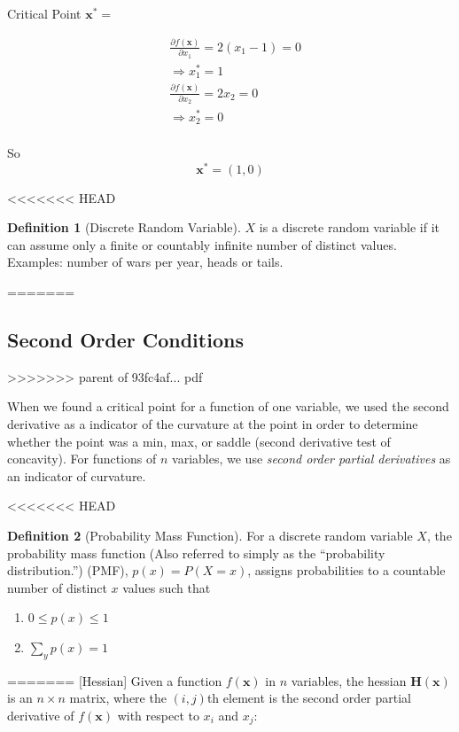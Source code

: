 \documentclass[]{book}
\providecommand{\tightlist}{%
  \setlength{\itemsep}{0pt}\setlength{\parskip}{0pt}}
\theoremstyle{definition}
\newtheorem{definition}{Definition}[chapter]
\theoremstyle{definition}
\theoremstyle{definition}
\theoremstyle{remark}
\begin{document}
Critical Point \(\mathbf{x}^* =\)

\begin{align*}
&\frac{\partial f(\mathbf{x})}{\partial x_1} = 2(x_1-1) = 0\\
&\Rightarrow x_1^* = 1\\
&\frac{\partial f(\mathbf{x})}{\partial x_2} = 2x_2 = 0\\
&\Rightarrow   x_2^* = 0\\
\end{align*}

So \[\mathbf{x}^* = (1,0)\]

<<<<<<< HEAD
\begin{definition}[Discrete Random Variable]
\protect\hypertarget{def:unnamed-chunk-75}{}{\label{def:unnamed-chunk-75} {} }\(X\) is a discrete random variable if it can assume only a finite or countably infinite number of distinct values. Examples: number of wars per year, heads or tails.
\end{definition}
=======
\hypertarget{second-order-conditions}{%
\subsection*{Second Order Conditions}\label{second-order-conditions}}
>>>>>>> parent of 93fc4af... pdf

When we found a critical point for a function of one variable, we used the second derivative as a indicator of the curvature at the point in order to determine whether the point was a min, max, or saddle (second derivative test of concavity). For functions of \(n\) variables, we use \emph{second order partial derivatives} as an indicator of curvature.

<<<<<<< HEAD
\begin{definition}[Probability Mass Function]
\protect\hypertarget{def:unnamed-chunk-76}{}{\label{def:unnamed-chunk-76} {} }
For a discrete random variable \(X\), the probability mass function (Also referred to simply as the ``probability distribution.'') (PMF), \(p(x)=P(X=x)\), assigns probabilities to a countable number of distinct \(x\) values such that

\begin{enumerate}
\def\labelenumi{\arabic{enumi}.}
\tightlist
\item
  \(0\le p(x)\le 1\)
\item
  \(\sum\limits_y p(x)=1\)
\end{enumerate}
\end{definition}
=======
[Hessian]
\protect\hypertarget{def:unnamed-chunk-56}{}{\label{def:unnamed-chunk-56} {} }
Given a function \(f(\mathbf{x})\) in \(n\) variables, the hessian \(\mathbf{H(x)}\) is
an \(n\times n\) matrix, where the \((i,j)\)th element is the second order
partial derivative of \(f(\mathbf{x})\) with respect to \(x_i\) and \(x_j\):
\end{document}
